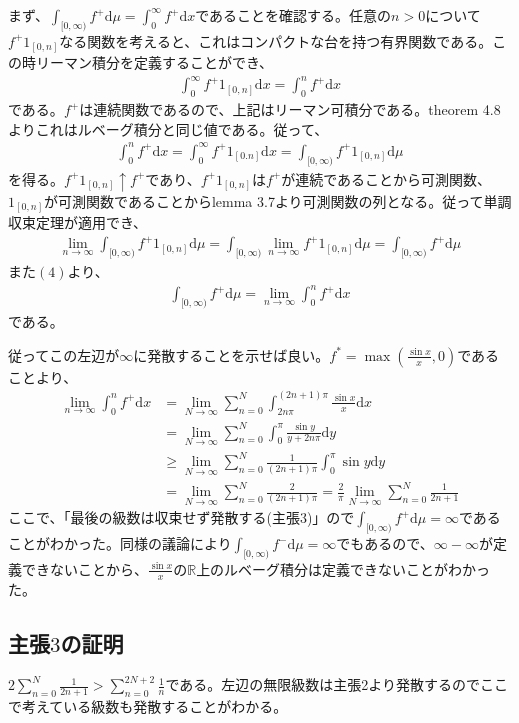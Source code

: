 \documentclass{article}
\begin{document}
まず、$\int_{[0, \infty)} f^{+} \mathrm{d}\mu = \int_0^{\infty} f^{+} \mathrm{d}x$であることを確認する。任意の$n > 0$について$f^{+} 1_{[0, n]}$なる関数を考えると、これはコンパクトな台を持つ有界関数である。この時リーマン積分を定義することができ、
\begin{align*}
	\int_0^{\infty} f^{+} 1_{[0, n]} \mathrm{d}x = \int_0^n f^{+}\mathrm{d}x
\end{align*}
である。$f^{+}$は連続関数であるので、上記はリーマン可積分である。theorem 4.8よりこれはルベーグ積分と同じ値である。従って、
\begin{align}
	\int_0^n f^{+} \mathrm{d}x = \int_0^{\infty} f^{+} 1_{[0. n]}\mathrm{d}x = \int_{[0, \infty)} f^{+}1_{[0, n]} \mathrm{d}\mu
\end{align}
を得る。$f^{+} 1_{[0, n]} \uparrow f^{+}$であり、$f^{+} 1_{[0, n]}$は$f^{+}$が連続であることから可測関数、$1_{[0, n]}$が可測関数であることからlemma 3.7より可測関数の列となる。従って単調収束定理が適用でき、
\begin{align*}
	\lim_{n\to \infty} \int_{[0, \infty)} f^{+} 1_{[0, n]} \mathrm{d}\mu = \int_{[0, \infty)} \lim_{n\to \infty} f^{+} 1_{[0, n]} \mathrm{d}\mu = \int_{[0, \infty)}  f^{+}  \mathrm{d}\mu
\end{align*}
また$(4)$より、
\begin{align*}
	\int_{[0, \infty)}  f^{+}  \mathrm{d}\mu = \lim_{n\to \infty} \int_0^n f^{+} \mathrm{d}x
\end{align*}
である。

従ってこの左辺が$\infty$に発散することを示せば良い。$f^{*} = \max \left( \frac{\sin x}{x}, 0 \right)$であることより、
\begin{align*}
	\lim_{n\to \infty} \int_0^n f^{+} \mathrm{d}x &= \lim_{N \to \infty} \sum_{n = 0}^{N} \int_{2n\pi}^{(2n + 1)\pi} \frac{\sin x}{x} \mathrm{d}x\\[8pt]
	&= \lim_{N \to \infty} \sum_{n = 0}^{N} \int_0^{\pi} \frac{\sin y}{y + 2n\pi} \mathrm{d}y\\[8pt]
	&\geq  \lim_{N \to \infty} \sum_{n = 0}^{N} \frac{1}{(2n+1)\pi} \int_0^{\pi} \sin y \mathrm{d}y\\[8pt]
	&= \lim_{N \to \infty} \sum_{n = 0}^{N} \frac{2}{(2n + 1)\pi} = \frac{2}{\pi} \lim_{N \to \infty} \sum_{n = 0}^{N} \frac{1}{2n + 1}
\end{align*}
ここで、「最後の級数は収束せず発散する(主張$3$)」ので$\int_{[0, \infty)}  f^{+}  \mathrm{d}\mu = \infty$であることがわかった。同様の議論により$\int_{[0, \infty)}  f^{-}  \mathrm{d}\mu = \infty$でもあるので、$\infty -\infty$が定義できないことから、$\frac{\sin x}{x}$の$\mathbb{R}$上のルベーグ積分は定義できないことがわかった。

\subsection{主張$3$の証明}
$2 \sum_{n = 0}^{N} \frac{1}{2n + 1} > \sum_{n = 0}^{2N + 2} \frac{1}{n}$である。左辺の無限級数は主張2より発散するのでここで考えている級数も発散することがわかる。
\end{document}

